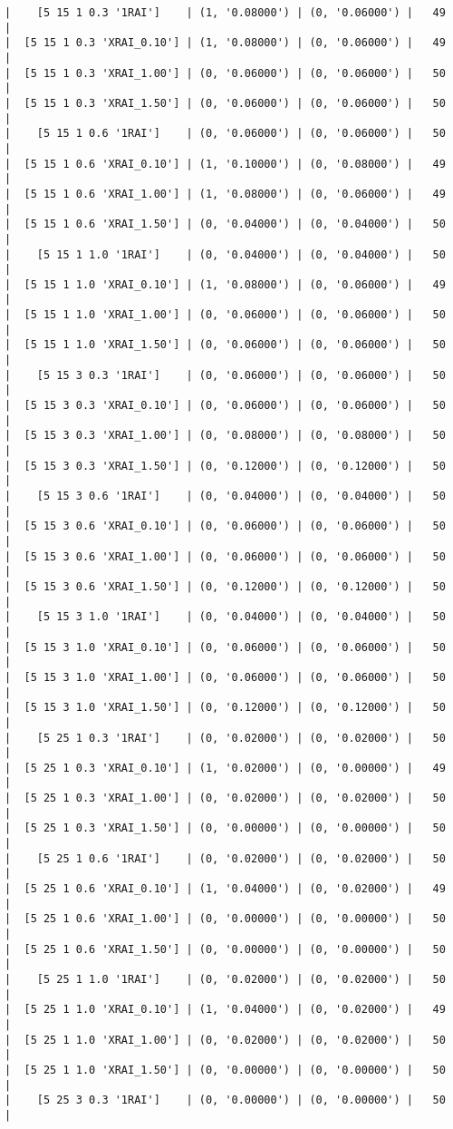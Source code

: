 \documentclass{article}
\begin{document}
\begin{verbatim}
|    [5 15 1 0.3 '1RAI']    | (1, '0.08000') | (0, '0.06000') |   49  |
|  [5 15 1 0.3 'XRAI_0.10'] | (1, '0.08000') | (0, '0.06000') |   49  |
|  [5 15 1 0.3 'XRAI_1.00'] | (0, '0.06000') | (0, '0.06000') |   50  |
|  [5 15 1 0.3 'XRAI_1.50'] | (0, '0.06000') | (0, '0.06000') |   50  |
|    [5 15 1 0.6 '1RAI']    | (0, '0.06000') | (0, '0.06000') |   50  |
|  [5 15 1 0.6 'XRAI_0.10'] | (1, '0.10000') | (0, '0.08000') |   49  |
|  [5 15 1 0.6 'XRAI_1.00'] | (1, '0.08000') | (0, '0.06000') |   49  |
|  [5 15 1 0.6 'XRAI_1.50'] | (0, '0.04000') | (0, '0.04000') |   50  |
|    [5 15 1 1.0 '1RAI']    | (0, '0.04000') | (0, '0.04000') |   50  |
|  [5 15 1 1.0 'XRAI_0.10'] | (1, '0.08000') | (0, '0.06000') |   49  |
|  [5 15 1 1.0 'XRAI_1.00'] | (0, '0.06000') | (0, '0.06000') |   50  |
|  [5 15 1 1.0 'XRAI_1.50'] | (0, '0.06000') | (0, '0.06000') |   50  |
|    [5 15 3 0.3 '1RAI']    | (0, '0.06000') | (0, '0.06000') |   50  |
|  [5 15 3 0.3 'XRAI_0.10'] | (0, '0.06000') | (0, '0.06000') |   50  |
|  [5 15 3 0.3 'XRAI_1.00'] | (0, '0.08000') | (0, '0.08000') |   50  |
|  [5 15 3 0.3 'XRAI_1.50'] | (0, '0.12000') | (0, '0.12000') |   50  |
|    [5 15 3 0.6 '1RAI']    | (0, '0.04000') | (0, '0.04000') |   50  |
|  [5 15 3 0.6 'XRAI_0.10'] | (0, '0.06000') | (0, '0.06000') |   50  |
|  [5 15 3 0.6 'XRAI_1.00'] | (0, '0.06000') | (0, '0.06000') |   50  |
|  [5 15 3 0.6 'XRAI_1.50'] | (0, '0.12000') | (0, '0.12000') |   50  |
|    [5 15 3 1.0 '1RAI']    | (0, '0.04000') | (0, '0.04000') |   50  |
|  [5 15 3 1.0 'XRAI_0.10'] | (0, '0.06000') | (0, '0.06000') |   50  |
|  [5 15 3 1.0 'XRAI_1.00'] | (0, '0.06000') | (0, '0.06000') |   50  |
|  [5 15 3 1.0 'XRAI_1.50'] | (0, '0.12000') | (0, '0.12000') |   50  |
|    [5 25 1 0.3 '1RAI']    | (0, '0.02000') | (0, '0.02000') |   50  |
|  [5 25 1 0.3 'XRAI_0.10'] | (1, '0.02000') | (0, '0.00000') |   49  |
|  [5 25 1 0.3 'XRAI_1.00'] | (0, '0.02000') | (0, '0.02000') |   50  |
|  [5 25 1 0.3 'XRAI_1.50'] | (0, '0.00000') | (0, '0.00000') |   50  |
|    [5 25 1 0.6 '1RAI']    | (0, '0.02000') | (0, '0.02000') |   50  |
|  [5 25 1 0.6 'XRAI_0.10'] | (1, '0.04000') | (0, '0.02000') |   49  |
|  [5 25 1 0.6 'XRAI_1.00'] | (0, '0.00000') | (0, '0.00000') |   50  |
|  [5 25 1 0.6 'XRAI_1.50'] | (0, '0.00000') | (0, '0.00000') |   50  |
|    [5 25 1 1.0 '1RAI']    | (0, '0.02000') | (0, '0.02000') |   50  |
|  [5 25 1 1.0 'XRAI_0.10'] | (1, '0.04000') | (0, '0.02000') |   49  |
|  [5 25 1 1.0 'XRAI_1.00'] | (0, '0.02000') | (0, '0.02000') |   50  |
|  [5 25 1 1.0 'XRAI_1.50'] | (0, '0.00000') | (0, '0.00000') |   50  |
|    [5 25 3 0.3 '1RAI']    | (0, '0.00000') | (0, '0.00000') |   50  |

\end{verbatim}
\end{document}
